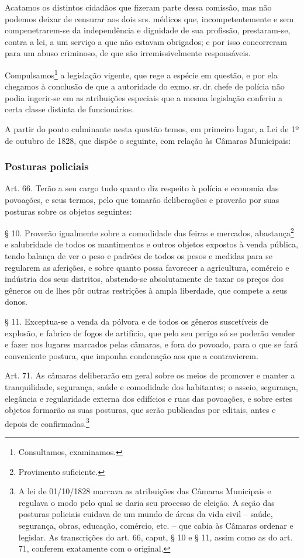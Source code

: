 Acatamos os distintos cidadãos que fizeram parte dessa comissão, mas não
podemos deixar de censurar aos dois srs. médicos que, incompetentemente
e sem compenetrarem-se da independência e dignidade de sua profissão,
prestaram-se, contra a lei, a um serviço a que não estavam obrigados; e
por isso concorreram para um abuso criminoso, de que são
irremissivelmente responsáveis.

Compulsamos\footnote{Consultamos, examinamos.} a legislação vigente,
que rege a espécie em questão, e por ela chegamos à conclusão de que a
autoridade do exmo.\,sr.\,dr.\,chefe de polícia não podia ingerir-se em as
atribuições especiais que a mesma legislação conferiu a certa classe
distinta de funcionários.

A partir do ponto culminante nesta questão temos, em primeiro lugar, a
Lei de 1º de outubro de 1828, que dispõe o seguinte, com relação às
Câmaras Municipais:

\subsubsection{Posturas policiais}

Art. 66. Terão a seu cargo tudo quanto diz respeito à polícia e economia
das povoações, e seus termos, pelo que tomarão deliberações e proverão
por suas posturas sobre os objetos seguintes:

\noindent\dotfill

§ 10. Proverão igualmente sobre a comodidade das feiras e mercados,
abastança\footnote{Provimento suficiente.} e salubridade de todos os
mantimentos e outros objetos expostos à venda pública, tendo balança de
ver o peso e padrões de todos os pesos e medidas para se regularem as
aferições, e sobre quanto possa favorecer a agricultura, comércio e
indústria dos seus distritos, abstendo-se absolutamente de taxar os
preços dos gêneros ou de lhes pôr outras restrições à ampla liberdade,
que compete a seus donos.

§ 11. Exceptua-se a venda da pólvora e de todos os gêneros suscetíveis
de explosão, e fabrico de fogos de artifício, que pelo seu perigo só se
poderão vender e fazer nos lugares marcados pelas câmaras, e fora do
povoado, para o que se fará conveniente postura, que imponha condenação
aos que a contravierem.

Art. 71. As câmaras deliberarão em geral sobre os meios de promover e
manter a tranquilidade, segurança, saúde e comodidade dos habitantes; o
asseio, segurança, elegância e regularidade externa dos edifícios e ruas
das povoações, e sobre estes objetos formarão as suas posturas, que
serão publicadas por editais, antes e depois de confirmadas.\footnote{
  A lei de 01/10/1828 marcava as atribuições das Câmaras Municipais e
  regulava o modo pelo qual se daria seu processo de eleição. A seção
  das posturas policiais cuidava de um mundo de áreas da vida civil --
  saúde, segurança, obras, educação, comércio, etc. -- que cabia às
  Câmaras ordenar e legislar. As transcrições do art. 66, caput, § 10 e
  § 11, assim como as do art. 71, conferem exatamente com o original.}

